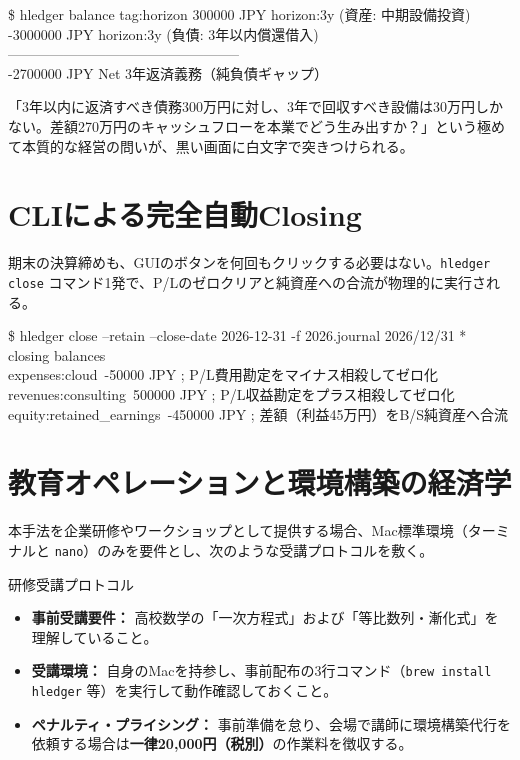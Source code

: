 \begin{terminalbox}{\$ hledger balance tag:horizon}
\phantom{-}300000 JPY \quad horizon:3y (資産: 中期設備投資)\\
-3000000 JPY \quad horizon:3y (負債: 3年以内償還借入)\\
--------------------------------------------------\\
-2700000 JPY \quad Net 3年返済義務（純負債ギャップ）
\end{terminalbox}

「3年以内に返済すべき債務300万円に対し、3年で回収すべき設備は30万円しかない。差額270万円のキャッシュフローを本業でどう生み出すか？」という極めて本質的な経営の問いが、黒い画面に白文字で突きつけられる。

\section{CLIによる完全自動Closing}
期末の決算締めも、GUIのボタンを何回もクリックする必要はない。\texttt{hledger close} コマンド1発で、P/Lのゼロクリアと純資産への合流が物理的に実行される。

\begin{terminalbox}{\$ hledger close --retain --close-date 2026-12-31 -f 2026.journal}
2026/12/31 * closing balances\\
\quad expenses:cloud\qquad\qquad\ -50000 JPY \quad ; P/L費用勘定をマイナス相殺してゼロ化\\
\quad revenues:consulting\qquad\ 500000 JPY \quad ; P/L収益勘定をプラス相殺してゼロ化\\
\quad equity:retained\_earnings\ -450000 JPY \quad ; 差額（利益45万円）をB/S純資産へ合流
\end{terminalbox}

\section{教育オペレーションと環境構築の経済学}
本手法を企業研修やワークショップとして提供する場合、Mac標準環境（ターミナルと \texttt{nano}）のみを要件とし、次のような受講プロトコルを敷く。

\begin{rulebox}{研修受講プロトコル}
\begin{itemize}
    \item \textbf{事前受講要件：} 高校数学の「一次方程式」および「等比数列・漸化式」を理解していること。
    \item \textbf{受講環境：} 自身のMacを持参し、事前配布の3行コマンド（\texttt{brew install hledger} 等）を実行して動作確認しておくこと。
    \item \textbf{ペナルティ・プライシング：} 事前準備を怠り、会場で講師に環境構築代行を依頼する場合は\textbf{一律20,000円（税別）}の作業料を徴収する。
\end{itemize}
\end{rulebox}

